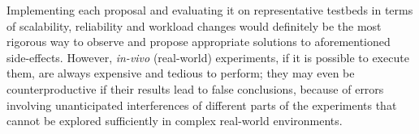 \documentclass[conference]{IEEEtran}
\begin{document}
Implementing each proposal and evaluating it on representative
testbeds in terms of scalability, reliability and workload changes
would definitely be the most rigorous way to observe and propose
appropriate solutions to aforementioned
side-effects.
However, \textit{in-vivo} (\ie real-world) experiments, if it is
possible to execute them, are always expensive and tedious to perform;
they may even be counterproductive if their results lead to false
conclusions, \eg because of errors involving unanticipated
interferences of different parts of the experiments that cannot be
explored sufficiently in complex real-world environments.
\end{document}
